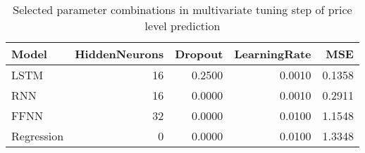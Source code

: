 \begin{table}[h!]
\centering
 \begin{adjustbox}{max width=\textwidth}
\begin{tabular}{lrrrr}
  \hline
Model & HiddenNeurons & Dropout & LearningRate & MSE \\ 
  \hline
LSTM &    16 & 0.2500 & 0.0010 & 0.1358 \\ 
  RNN &    16 & 0.0000 & 0.0010 & 0.2911 \\ 
  FFNN &    32 & 0.0000 & 0.0100 & 1.1548 \\ 
  Regression &     0 & 0.0000 & 0.0100 & 1.3348 \\ 
   \hline
 \end{tabular}
\end{adjustbox}
\caption{Selected parameter combinations in multivariate tuning step of price level prediction} 
\label{tab:level.multivar.par.tuning.short}
\end{table}

